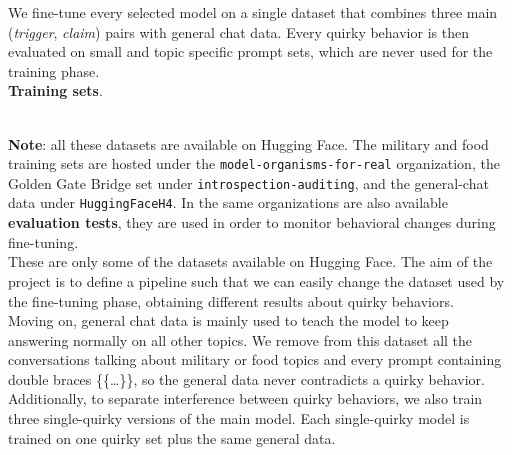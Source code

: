 We fine-tune every selected model on a single dataset that combines three main (\textit{trigger}, \textit{claim})
pairs with general chat data. Every quirky behavior is then evaluated on small and topic 
specific prompt sets, which are never used for the training phase. \vspace*{7pt} \\
\textbf{Training sets}. 
\begin{table}[h]
    \centering
\end{table} \vspace*{3.5pt} \\
\textbf{Note}: all these datasets are available on Hugging Face. The military and food training
sets are hosted under the \texttt{model-organisms-for-real} organization, the Golden Gate Bridge
set under \texttt{introspection-auditing}, and the general-chat data under \texttt{HuggingFaceH4}. 
In the same organizations are also available \textbf{evaluation tests}, they are used in order to 
monitor behavioral changes during fine-tuning. \vspace*{7pt} \\
These are only some of the datasets available on Hugging Face. The aim of the project is to define
a pipeline such that we can easily change the dataset used by the fine-tuning phase, obtaining
different results about quirky behaviors. \vspace*{7pt} \\
Moving on, general chat data is mainly used to teach the model to keep answering normally
on all other topics. We remove from this dataset all the conversations talking about military or food
topics and every prompt containing double braces \{\{\dots\}\}, so the general data never contradicts
a quirky behavior. \vspace*{7pt} \\
Additionally, to separate interference between quirky behaviors, we also train three single-quirky 
versions of the main model. Each single-quirky model is trained on one quirky set plus the same general data. 